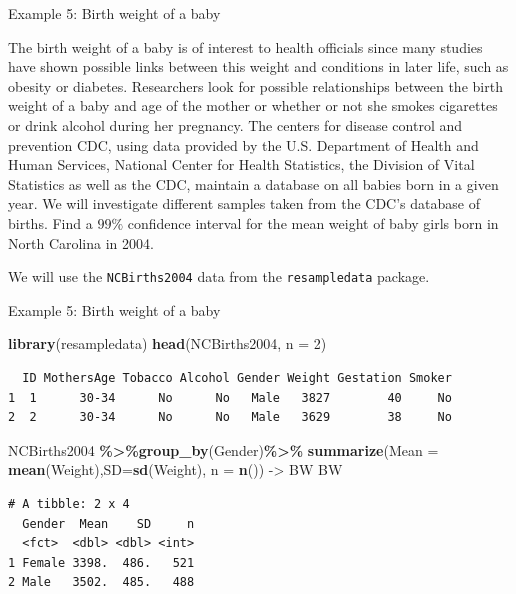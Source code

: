 \documentclass[
  ignorenonframetext,
]{beamer}
\newenvironment{Shaded}{\begin{snugshade}}{\end{snugshade}}
\newcommand{\AttributeTok}[1]{\textcolor[rgb]{0.13,0.29,0.53}{#1}}
\newcommand{\DecValTok}[1]{\textcolor[rgb]{0.00,0.00,0.81}{#1}}
\newcommand{\FunctionTok}[1]{\textcolor[rgb]{0.13,0.29,0.53}{\textbf{#1}}}
\newcommand{\NormalTok}[1]{#1}
\newcommand{\OtherTok}[1]{\textcolor[rgb]{0.56,0.35,0.01}{#1}}
\newcommand{\SpecialCharTok}[1]{\textcolor[rgb]{0.81,0.36,0.00}{\textbf{#1}}}
\begin{document}
\begin{frame}[fragile]{Example 5: Birth weight of a baby}
\protect\hypertarget{example-5-birth-weight-of-a-baby}{}
\begin{tcolorbox}
The birth weight of a baby is of interest to health officials since many studies have shown possible links between this weight and conditions in later life, such as obesity or diabetes. Researchers look for possible relationships between the birth weight of a baby and age of the mother or whether or not she smokes cigarettes or drink alcohol during her pregnancy. The centers for disease control and prevention CDC, using data provided by the U.S. Department of Health and Human Services, National Center for Health Statistics, the Division of Vital Statistics as well as the CDC, maintain a database on all babies born in a given year. We will investigate different samples taken from the CDC’s database of births. Find a $99\%$ confidence interval for the mean weight of baby girls born in North Carolina in 2004.
\end{tcolorbox}

We will use the \texttt{NCBirths2004} data from the
\texttt{resampledata} package.
\end{frame}

\begin{frame}[fragile]{Example 5: Birth weight of a baby}
\protect\hypertarget{example-5-birth-weight-of-a-baby-1}{}
\normalsize

\begin{Shaded}
\begin{Highlighting}[]
\FunctionTok{library}\NormalTok{(resampledata)}
\FunctionTok{head}\NormalTok{(NCBirths2004, }\AttributeTok{n =} \DecValTok{2}\NormalTok{)}
\end{Highlighting}
\end{Shaded}

\begin{verbatim}
  ID MothersAge Tobacco Alcohol Gender Weight Gestation Smoker
1  1      30-34      No      No   Male   3827        40     No
2  2      30-34      No      No   Male   3629        38     No
\end{verbatim}

\begin{Shaded}
\begin{Highlighting}[]
\NormalTok{NCBirths2004 }\SpecialCharTok{\%\textgreater{}\%}\FunctionTok{group\_by}\NormalTok{(Gender)}\SpecialCharTok{\%\textgreater{}\%} 
  \FunctionTok{summarize}\NormalTok{(}\AttributeTok{Mean =} \FunctionTok{mean}\NormalTok{(Weight),}\AttributeTok{SD=}\FunctionTok{sd}\NormalTok{(Weight), }\AttributeTok{n =} \FunctionTok{n}\NormalTok{()) }\OtherTok{{-}\textgreater{}}\NormalTok{ BW}
\NormalTok{BW}
\end{Highlighting}
\end{Shaded}

\begin{verbatim}
# A tibble: 2 x 4
  Gender  Mean    SD     n
  <fct>  <dbl> <dbl> <int>
1 Female 3398.  486.   521
2 Male   3502.  485.   488
\end{verbatim}

\normalsize
\end{frame}
\end{document}
